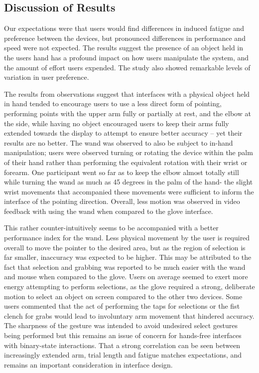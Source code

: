 \subsection{Discussion of Results}

Our expectations were that users would find differences in induced fatigue and preference between the devices, but pronounced differences in performance and speed were not expected.  The results suggest the presence of an object held in the users hand has a profound impact on how users manipulate the system, and the amount of effort users expended. The study also showed remarkable levels of variation in user preference.

The results from observations suggest that interfaces with a physical object held in hand tended to encourage users to use a less direct form of pointing, performing points with the upper arm fully or partially at rest, and the elbow at the side, while having no object encouraged users to keep their arms fully extended towards the display to attempt to ensure better accuracy – yet their results are no better. The wand was observed to also be subject to in-hand manipulation; users were observed turning or rotating the device within the palm of their hand rather than performing the equivalent rotation with their wrist or forearm. One participant went so far as to keep the elbow almost totally still while turning the wand as much as 45 degrees in the palm of the hand- the slight wrist movements that accompanied these movements were sufficient to inform the interface of the pointing direction. Overall, less motion was observed in video feedback with using the wand when compared to the glove interface.

This rather counter-intuitively seems to be accompanied with a better performance index for the wand. Less physical movement by the user is required overall to move the pointer to the desired area, but as the region of selection is far smaller, inaccuracy was expected to be higher. This may be attributed to the fact that selection and grabbing was reported to be much easier with the wand and mouse when compared to the glove. Users on average seemed to exert more energy attempting to perform selections, as the glove required a strong, deliberate motion to select an object on screen compared to the other two devices. Some users commented that the act of performing the taps for selections or the fist clench for grabs would lead to involuntary arm movement that hindered accuracy. The sharpness of the gesture was intended to avoid undesired select gestures being performed but this remains an issue of concern for hands-free interfaces with binary-state interactions. That a strong correlation can be seen between increasingly extended arm, trial length and fatigue matches expectations, and remains an important consideration in interface design.

